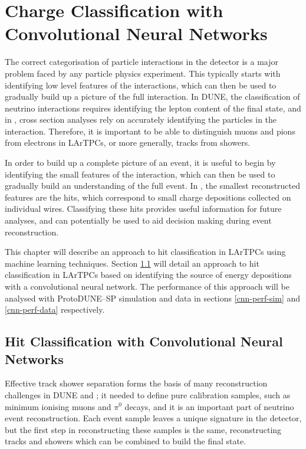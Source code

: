 \chapter{\label{ch:chargeid}Charge Classification with Convolutional Neural 
Networks} 

\minitoc

The correct categorisation of particle interactions in the detector is a major
problem faced by any particle physics experiment. This typically starts with
identifying low level features of the interactions, which can then be used to
gradually build up a picture of the full interaction. In DUNE, the
classification of neutrino interactions requires identifying the lepton content
of the final state, and in \protodune{}, cross section analyses rely on
accurately identifying the particles in the interaction. Therefore, it is
important to be able to distinguish muons and pions from electrons in LArTPCs, 
or more generally, tracks from showers.

In order to build up a complete picture of an event, it is useful to begin by
identifying the small features of the interaction, which can then be used to
gradually build an understanding of the full event. In \protodune{}, the
smallest reconstructed features are the hits, which correspond to small charge 
depositions collected on individual wires. Classifying these hits provides
useful information for future analyses, and can potentially be used to aid
decision making during event reconstruction.

This chapter will describe an approach to hit classification in LArTPCs using
machine learning techniques. Section \ref{hit-id} will detail an approach to 
hit classification in LArTPCs based on identifying the source of energy 
depositions with a convolutional neural network.  The performance of this 
approach will be analysed with ProtoDUNE--SP simulation and data in sections 
\ref{cnn-perf-sim} and \ref{cnn-perf-data} respectively.

\section{Hit Classification with Convolutional Neural Networks} \label{hit-id}

Effective track shower separation forms the basis of many reconstruction
challenges in DUNE and \protodune{}; it needed to define pure calibration
samples, such as minimum ionising muons and $\pi^0$ decays, and it is an
important part of neutrino event reconstruction. Each event sample leaves a
unique signature in the detector, but the first step in reconstructing these
samples is the same, reconstructing tracks and showers which can be combined to
build the final state. 

